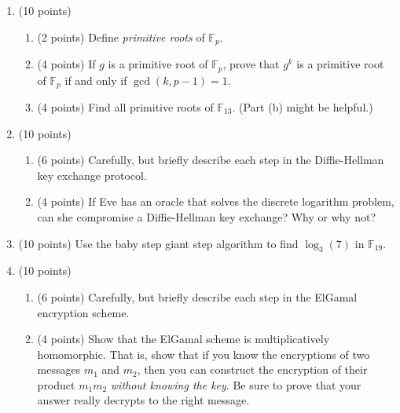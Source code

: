 \documentclass[11pt]{article}
\theoremstyle{plain}
\newcommand{\F}{\mathbb{F}}
\begin{document}
\begin{enumerate}
    \item (10 points)
    \begin{enumerate}
        \item (2 points) Define \emph{primitive roots} of $\F_p$.
        \vfill

        \item (4 points) If $g$ is a primitive root of $\F_p$, prove that $g^k$ is a primitive root of $\F_p$ if and only if $\gcd(k, p-1) = 1$.
        \vfill

        \item (4 points) Find all primitive roots of $\F_{13}$. (Part (b) might be helpful.)
        \vfill
    \end{enumerate}


    \newpage

    \item (10 points)
    \begin{enumerate}
        \item (6 points) Carefully, but briefly describe each step in the Diffie-Hellman key exchange protocol.

        \vfill

        \item (4 points) If Eve has an oracle that solves the discrete logarithm problem, can she compromise a Diffie-Hellman key exchange? Why or why not?
        \vfill
    \end{enumerate}

    \newpage

    \item (10 points) Use the baby step giant step algorithm to find $\log_3(7)$ in $\F_{19}$.

    \newpage

    \item (10 points)
    \begin{enumerate}
        \item (6 points) Carefully, but briefly describe each step in the ElGamal encryption scheme.

        \vfill

        \item (4 points) Show that the ElGamal scheme is multiplicatively homomorphic. That is, show that if you know the encryptions of two messages $m_1$ and $m_2$, then you can construct the encryption of their product $m_1m_2$ \emph{without knowing the key}.
        Be sure to prove that your answer really decrypts to the right message.


\end{enumerate}
\end{enumerate}
\end{document}
